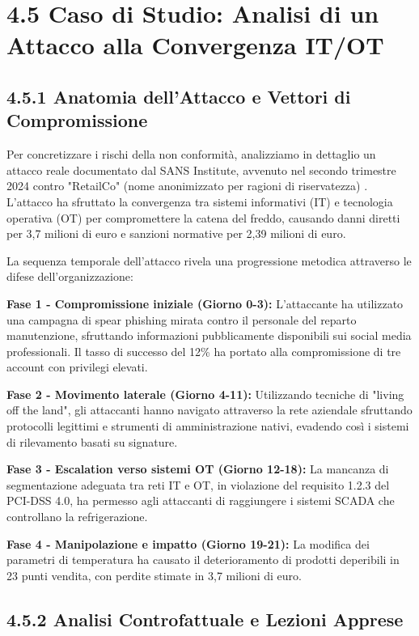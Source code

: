 \section{4.5 Caso di Studio: Analisi di un Attacco alla Convergenza IT/OT}

\subsection{4.5.1 Anatomia dell'Attacco e Vettori di Compromissione}

Per concretizzare i rischi della non conformità, analizziamo in dettaglio un attacco reale documentato dal SANS Institute, avvenuto nel secondo trimestre 2024 contro "RetailCo" (nome anonimizzato per ragioni di riservatezza) \autocite{SANS2024}. L'attacco ha sfruttato la convergenza tra sistemi informativi (IT) e tecnologia operativa (OT) per compromettere la catena del freddo, causando danni diretti per 3,7 milioni di euro e sanzioni normative per 2,39 milioni di euro.

La sequenza temporale dell'attacco rivela una progressione metodica attraverso le difese dell'organizzazione:

\textbf{Fase 1 - Compromissione iniziale (Giorno 0-3):}
L'attaccante ha utilizzato una campagna di spear phishing mirata contro il personale del reparto manutenzione, sfruttando informazioni pubblicamente disponibili sui social media professionali. Il tasso di successo del 12\% ha portato alla compromissione di tre account con privilegi elevati.

\textbf{Fase 2 - Movimento laterale (Giorno 4-11):}
Utilizzando tecniche di "living off the land", gli attaccanti hanno navigato attraverso la rete aziendale sfruttando protocolli legittimi e strumenti di amministrazione nativi, evadendo così i sistemi di rilevamento basati su signature.

\textbf{Fase 3 - Escalation verso sistemi OT (Giorno 12-18):}
La mancanza di segmentazione adeguata tra reti IT e OT, in violazione del requisito 1.2.3 del PCI-DSS 4.0, ha permesso agli attaccanti di raggiungere i sistemi SCADA che controllano la refrigerazione.

\textbf{Fase 4 - Manipolazione e impatto (Giorno 19-21):}
La modifica dei parametri di temperatura ha causato il deterioramento di prodotti deperibili in 23 punti vendita, con perdite stimate in 3,7 milioni di euro.

\subsection{4.5.2 Analisi Controfattuale e Lezioni Apprese}

